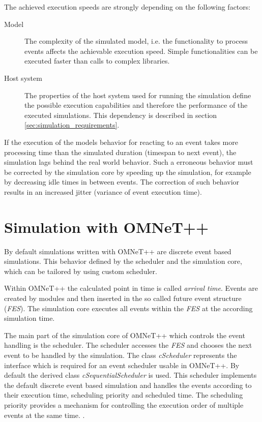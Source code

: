 The achieved execution speeds are strongly depending on the following factors:
\begin{description}
    \item[Model] The complexity of the simulated model, i.e. the functionality to process events affects the achievable execution speed.
                 Simple functionalities can be executed faster than calls to complex libraries.
    \item[Host system] The properties of the host system used for running the simulation define the possible execution capabilities and therefore the performance of the executed simulations.
                       This dependency is described in section \ref{sec:simulation_requirements}.
\end{description}

If the execution of the models behavior for reacting to an event takes more processing time than the simulated duration (timespan to next event), the simulation lags behind the real world behavior.
Such a erroneous behavior must be corrected by the simulation core by speeding up the simulation, for example by decreasing idle times in between events.
The correction of such behavior results in an increased jitter (variance of event execution time).
 \cite[section III.B]{belanger_what_2010}


\section{Simulation with OMNeT++}
\label{sec:simulation_omnet}
By default simulations written with OMNeT++ are discrete event based simulations.
This behavior defined by the scheduler and the simulation core, which can be tailored by using custom scheduler. \cite[section 4.1]{omnet_manual}

Within OMNeT++ the calculated point in time is called \emph{arrival time}.
Events are created by modules and then inserted in the so called future event structure (\emph{FES}).
The simulation core executes all events within the \emph{FES} at the according simulation time.

The main part of the simulation core of OMNeT++ which controls the event handling is the scheduler.
The scheduler accesses the \emph{FES} and chooses the next event to be handled by the simulation.
The class \emph{cScheduler} represents the interface which is required for an event scheduler usable in OMNeT++.
By default the derived class \emph{cSequentialScheduler} is used.
This scheduler implements the default discrete event based simulation and handles the events according to their execution time, scheduling priority and scheduled time.
The scheduling priority provides a mechanism for controlling the execution order of multiple events at the same time. \cite[section 4.1]{omnet_manual}.
\\

